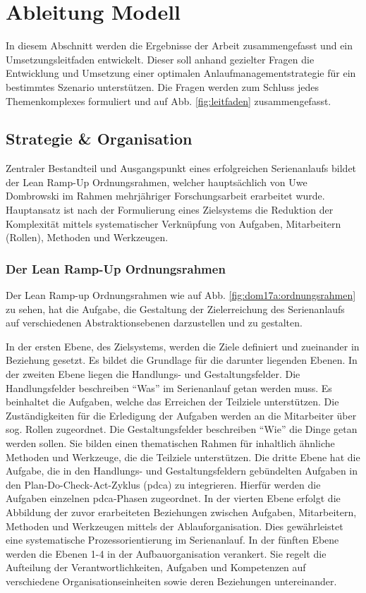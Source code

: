 \chapter{Ableitung Modell}\label{sec:ableitung}
In diesem Abschnitt werden die Ergebnisse der Arbeit zusammengefasst und ein Umsetzungsleitfaden entwickelt. %
Dieser soll anhand gezielter Fragen die Entwicklung und Umsetzung einer optimalen Anlaufmanagementstrategie für ein bestimmtes Szenario unterstützen. 
Die Fragen werden zum Schluss jedes Themenkomplexes formuliert und auf Abb. \ref{fig:leitfaden} %
zusammengefasst. 

\section{Strategie \& Organisation}

Zentraler Bestandteil und Ausgangspunkt eines erfolgreichen Serienanlaufs bildet der Lean Ramp-Up Ordnungsrahmen, welcher hauptsächlich von Uwe Dombrowski im Rahmen mehrjähriger Forschungsarbeit erarbeitet wurde. Hauptansatz ist nach der Formulierung eines Zielsystems die Reduktion der Komplexität mittels systematischer Verknüpfung von Aufgaben, Mitarbeitern (Rollen), Methoden und Werkzeugen. 

\subsection*{Der Lean Ramp-Up Ordnungsrahmen}
 Der Lean Ramp-up Ordnungsrahmen wie auf Abb. \ref{fig:dom17a:ordnungsrahmen} zu sehen, hat die Aufgabe, die Gestaltung der Zielerreichung des Serienanlaufs auf verschiedenen Abstraktionsebenen darzustellen und zu gestalten. 
 
In der ersten Ebene, des Zielsystems, werden die Ziele definiert und zueinander in Beziehung gesetzt. Es bildet die Grundlage für die darunter liegenden Ebenen. 
% 
In der zweiten Ebene liegen die Handlungs- und Gestaltungsfelder. Die Handlungsfelder beschreiben ``Was'' im Serienanlauf getan werden muss. 
Es beinhaltet die Aufgaben, welche das Erreichen der Teilziele unterstützen. Die Zuständigkeiten für die Erledigung der Aufgaben werden an die Mitarbeiter über sog. Rollen zugeordnet.
Die Gestaltungsfelder beschreiben ``Wie'' die Dinge getan werden sollen. Sie bilden einen thematischen Rahmen für inhaltlich ähnliche Methoden und Werkzeuge, die die Teilziele unterstützen.
% 
Die dritte Ebene hat die Aufgabe, die in den Handlungs- und Gestaltungsfeldern gebündelten Aufgaben in den Plan-Do-Check-Act-Zyklus (\gls{pdca}) zu integrieren. Hierfür werden die Aufgaben einzelnen \gls{pdca}-Phasen zugeordnet. 
% 
In der vierten Ebene erfolgt die Abbildung der zuvor erarbeiteten Beziehungen zwischen Aufgaben, Mitarbeitern, Methoden und Werkzeugen mittels der Ablauforganisation.  Dies gewährleistet eine systematische Prozessorientierung im Serienanlauf. 
% 
In der fünften Ebene werden die Ebenen 1-4 in der Aufbauorganisation verankert. Sie regelt die Aufteilung der Verantwortlichkeiten, Aufgaben und Kompetenzen auf verschiedene Organisationseinheiten sowie deren Beziehungen untereinander. 

